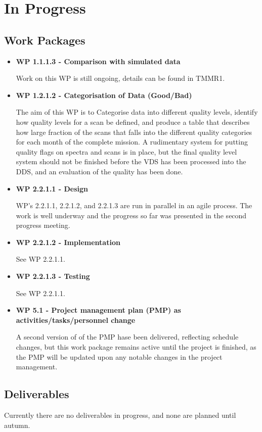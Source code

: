 \chapter{In Progress}
\label{chapter:in_progress}



\section{Work Packages}

\begin{itemize}

\item{\bf WP 1.1.1.3 - Comparison with simulated data}

Work on this WP is still ongoing, details can be found in TMMR1.


\item{\bf WP 1.2.1.2 - Categorisation of Data (Good/Bad)}

The aim of this WP is to Categorise data into different quality levels, identify how quality levels for a scan be defined, and produce a table that describes how large fraction of the scans that falls into the different quality categories for each month of the complete mission. A rudimentary system for putting quality flags on spectra and scans is in place, but the final quality level system should not be finished before the VDS has been processed into the DDS, and an evaluation of the quality has been done.   


\item{\bf WP 2.2.1.1 - Design}

WP's 2.2.1.1, 2.2.1.2, and 2.2.1.3 are run in parallel in an agile process. The work is well underway and the progress so far was presented in the second progress meeting. 

\item{\bf WP 2.2.1.2 - Implementation}

See WP 2.2.1.1.

\item{\bf WP 2.2.1.3 - Testing}

See WP 2.2.1.1.


\item{\bf WP 5.1 - Project management plan (PMP) as activities/tasks/personnel change}

A second version of of the PMP hase been delivered, reflecting schedule changes, but this work package remains active until the project is finished, as the PMP will be updated upon any notable
changes in the project management.


\end{itemize}


\section{Deliverables}

Currently there are no deliverables in progress, and none are planned until autumn.
